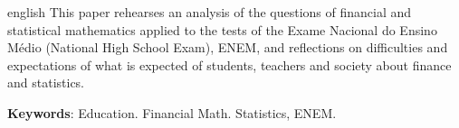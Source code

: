 
\begin{resumo}[Abstract]
 \begin{otherlanguage*}{english}
    This paper rehearses an analysis of the questions of financial and statistical mathematics applied to the tests of the Exame Nacional do Ensino Médio (National High School Exam), ENEM, and reflections on difficulties and expectations of what is expected of students, teachers and society about finance and statistics.
 
   \vspace{\onelineskip}
   
   \textbf{Keywords}: Education. Financial Math. Statistics, ENEM.
   
 \end{otherlanguage*}
\end{resumo}
